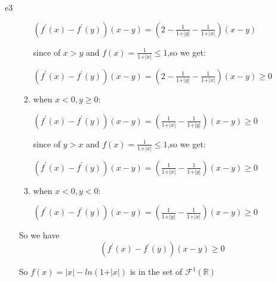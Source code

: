 \documentclass{article}
\begin{document}
\begin{PROOF}{e3}
\begin{enumerate}
\begin{enumerate}
		$\left( f^{'}(x)-f^{'}(y)\right) (x-y)=(2-\frac{1}{1+\vert y\vert}-\frac{1}{1+\vert x\vert})(x-y)$
		
		since of $x>y$ and $f(x)=\frac{1}{1+\vert x\vert}\le 1$,so we get:

		$\left( f^{'}(x)-f^{'}(y)\right) (x-y)=(2-\frac{1}{1+\vert y\vert}-\frac{1}{1+\vert x\vert})(x-y)\ge 0$

		\item when $x<0,y\ge 0$:
		
		$\left( f^{'}(x)-f^{'}(y)\right) (x-y)=(\frac{1}{1+\vert x\vert}-\frac{1}{1+\vert y\vert})(x-y)\ge 0$

		since of $y>x$ and $f(x)=\frac{1}{1+\vert x\vert}\le 1$,so we get:

		$\left( f^{'}(x)-f^{'}(y)\right) (x-y)=(\frac{1}{1+\vert x\vert}-\frac{1}{1+\vert y\vert})(x-y)\ge 0$
		
		\item when $x<0,y<0$:
		
		$\left( f^{'}(x)-f^{'}(y)\right) (x-y)=(\frac{1}{1+\vert y\vert}-\frac{1}{1+\vert x\vert})(x-y)\ge 0$
	\end{enumerate}
	So we have 
	\[\left( f^{'}(x)-f^{'}(y)\right) (x-y)\ge 0\]
	
	So $f(x)=\vert x\vert -ln(1+\vert x\vert)$ is in the set of $\mathcal{F}^1(\mathbb{R})$

\end{enumerate}





\end{PROOF}
\end{document}
